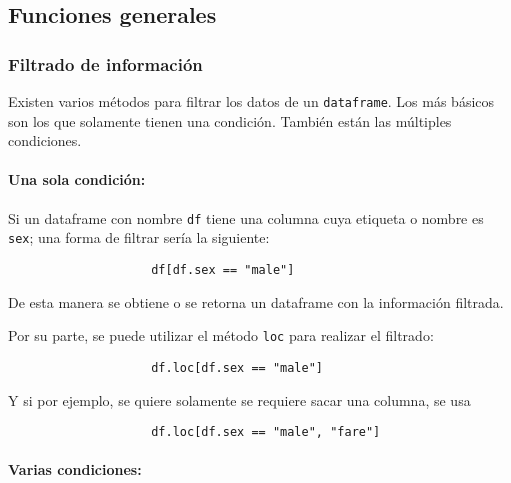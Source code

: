

\subsection{Funciones generales}

\subsubsection{Filtrado de información}

Existen varios métodos para filtrar los datos de un \texttt{dataframe}. Los más
básicos son los que solamente tienen una condición. También están las múltiples
condiciones.

\paragraph{Una sola condición:} Si un dataframe con nombre \texttt{df} tiene
una columna cuya etiqueta o nombre es \texttt{sex}; una forma de filtrar sería
la siguiente:

\begin{verbatim}
                    df[df.sex == "male"]
                    \end{verbatim}

De esta manera se obtiene o se retorna un dataframe con la información
filtrada.

Por su parte, se puede utilizar el método \texttt{loc} para realizar el
filtrado:

\begin{verbatim}
                    df.loc[df.sex == "male"]    
                    \end{verbatim}

Y si por ejemplo, se quiere solamente se requiere sacar una columna, se usa
\begin{verbatim}
                    df.loc[df.sex == "male", "fare"]    
                    \end{verbatim}

\paragraph{Varias condiciones:}

